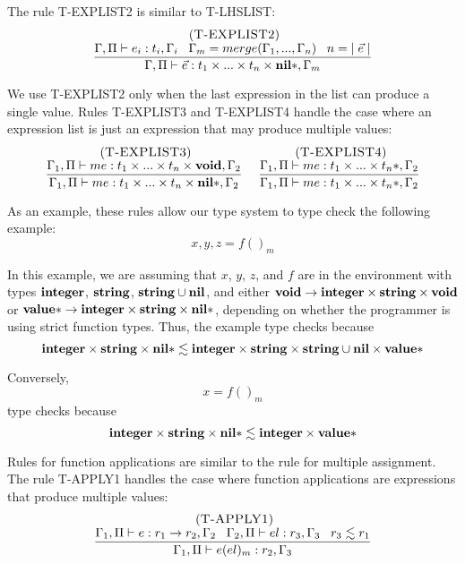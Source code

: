 The rule \textsc{T-EXPLIST2} is similar to \textsc{T-LHSLIST}:
\[
\begin{array}{c}
\; (\textsc{T-EXPLIST2})\\
\dfrac{\Gamma, \Pi \vdash e_{i}:t_{i}, \Gamma_{i} \;\;\;
       \Gamma_{m} = merge(\Gamma_{1}, ..., \Gamma_{n}) \;\;\;
       n = |\;\vec{e}\;|}
      {\Gamma, \Pi \vdash \vec{e}:t_{1} \times ... \times t_{n} \times \mathbf{nil}{*}, \Gamma_{m}}
\end{array}
\]

We use \textsc{T-EXPLIST2} only when the last expression in the list
can produce a single value.
Rules \textsc{T-EXPLIST3} and \textsc{T-EXPLIST4} handle the case where
an expression list is just an expression that may produce multiple values:
\[
\begin{array}{c}
\begin{array}{c}
\; (\textsc{T-EXPLIST3})\\
\dfrac{\Gamma_{1}, \Pi \vdash me:t_{1} \times ... \times t_{n} \times \mathbf{void}, \Gamma_{2}}
      {\Gamma_{1}, \Pi \vdash me:t_{1} \times ... \times t_{n} \times \mathbf{nil}{*}, \Gamma_{2}}
\end{array}
\;
\begin{array}{c}
\; (\textsc{T-EXPLIST4})\\
\dfrac{\Gamma_{1}, \Pi \vdash me:t_{1} \times ... \times t_{n}{*}, \Gamma_{2}}
      {\Gamma_{1}, \Pi \vdash me:t_{1} \times ... \times t_{n}{*}, \Gamma_{2}}
\end{array}
\end{array}
\]

As an example, these rules allow our type system to type check the following example:
\[
x, y, z = f()_{m}
\]

In this example, we are assuming that $x$, $y$, $z$, and $f$ are in
the environment with types $\mathbf{integer}$, $\mathbf{string}$, $\mathbf{string} \cup \mathbf{nil}$, and
either $\mathbf{void} \rightarrow \mathbf{integer} \times \mathbf{string} \times \mathbf{void}$ or
$\mathbf{value}{*} \rightarrow \mathbf{integer} \times \mathbf{string} \times \mathbf{nil}{*}$,
depending on whether the programmer is using strict function types.
Thus, the example type checks because
\[
\mathbf{integer} \times \mathbf{string} \times \mathbf{nil}{*} \lesssim \mathbf{integer} \times \mathbf{string} \times \mathbf{string} \cup \mathbf{nil} \times \mathbf{value}{*}
\]

Conversely,
\[
x = f()_{m}
\]
type checks because
\[
\mathbf{integer} \times \mathbf{string} \times \mathbf{nil}{*} \lesssim \mathbf{integer} \times \mathbf{value}{*}
\]

Rules for function applications are similar to the rule for multiple assignment.
The rule \textsc{T-APPLY1} handles the case where function applications
are expressions that produce multiple values:
\[
\begin{array}{c}
\; (\textsc{T-APPLY1})\\
\dfrac{\Gamma_{1}, \Pi \vdash e:r_{1} \rightarrow r_{2}, \Gamma_{2} \;\;\;
       \Gamma_{2}, \Pi \vdash el:r_{3}, \Gamma_{3} \;\;\;
       r_{3} \lesssim r_{1}}
      {\Gamma_{1}, \Pi \vdash e(el)_{m}:r_{2}, \Gamma_{3}}
\end{array}
\]

